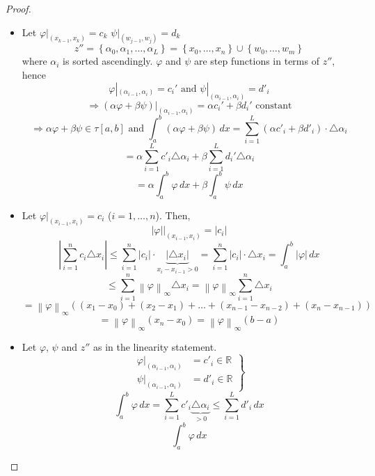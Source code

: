 \documentclass[a4paper,landscape,twocolumn]{article}
\theoremstyle{definition}
\newcommand\set[1]{\left\{#1\right\}}
\newcommand\abs[1]{\left|#1\right|}
\newcommand\norm[1]{\left\|#1\right\|}
\begin{document}
\begin{proof}
  \begin{itemize}
    \item Let $\varphi|_{(x_{k-1},x_k)} = c_k$ $\psi|_{(w_{j-1},w_j)} = d_k$
      \[ z'' = \set{\alpha_0, \alpha_1, \ldots, \alpha_L} = \set{x_0, \ldots, x_n} \cup \set{w_0, \ldots, w_m} \]
      where $\alpha_i$ is sorted ascendingly.
      $\varphi$ and $\psi$ are step functions in terms of $z''$, hence
      \[ \varphi|_{(\alpha_{i-1},\alpha_i)} = c_i' \text{ and } \psi|_{(\alpha_{i-1},\alpha_i)} = d'_i \]
      \[ \Rightarrow (\alpha \varphi + \beta \psi) |_{(\alpha_{i-1},\alpha_i)} = \alpha c_i' + \beta d_i' \text{ constant} \]
      \[ \Rightarrow \alpha \varphi + \beta \psi \in \tau[a,b] \text{ and } \int_a^b (\alpha \varphi + \beta \psi) \, dx = \sum_{i=1}^L (\alpha c'_i + \beta d'_i) \cdot \triangle \alpha_i \]
      \[ = \alpha \sum_{i=1}^L c'_i \triangle \alpha_i + \beta \sum_{i=1}^L d_i' \triangle \alpha_i \]
      \[ = \alpha \int_a^b \varphi \, dx + \beta \int_a^b \psi \, dx \]
    \item
      Let $\varphi|_{(x_{i-1},x_i)} = c_i$ ($i = 1, \ldots, n$). Then,
      \[ \abs{\varphi} |_{(x_{i-1},x_i)} = \abs{c_i} \]
      \[
        \abs{\sum_{i=1}^n c_i \triangle x_i}
        \leq \sum_{i=1}^n \abs{c_i} \cdot \underbrace{\abs{\triangle x_i}}_{x_i - x_{i-1} > 0}
        = \sum_{i=1}^n \abs{c_i} \cdot \triangle x_i = \int_a^b \abs{\varphi} \, dx
      \]
      \[
        \leq \sum_{i=1}^n \norm{\varphi}_\infty \triangle x_i
        = \norm{\varphi}_\infty \sum_{i=1}^n \triangle x_i
      \] \[
        = \norm{\varphi}_\infty \left((x_1 - x_0) + (x_2 - x_1) + \ldots + (x_{n-1} - x_{n-2}) + (x_n - x_{n-1})\right)
      \] \[
        = \norm{\varphi}_\infty (x_n - x_0) = \norm{\varphi}_\infty (b-a)
      \]
    \item
      Let $\varphi$, $\psi$ and $z''$ as in the linearity statement.
      \[
        \left.\begin{array}{rl}
          \varphi|_{(\alpha_{i-1},\alpha_i)} &= c'_i \in \mathbb R \\
          \psi|_{(\alpha_{i-1}, \alpha_i)} &= d'_i \in \mathbb R
        \end{array}\right\}
      \] \[
        \int_a^b \varphi \, dx = \sum_{i=1}^L c'_i \underbrace{\triangle \alpha_i}_{>0} \leq \sum_{i=1}^L d'_i \, dx
      \] \[
        \int_a^b \varphi \, dx
      \]
  \end{itemize}
\end{proof}
\end{document}
